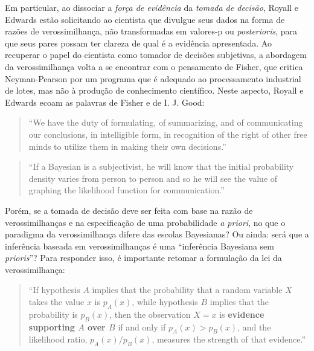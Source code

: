 Em particular, 
ao dissociar a {\em força de evidência} da {\em tomada de decisão}, Royall e Edwards estão solicitando ao cientista
que divulgue seus dados na forma de razões de verossimilhança, não transformadas em valores-p ou {\em posterioris}, para que
seus pares possam ter clareza de qual é a evidência apresentada. 
Ao recuperar o papel do cientista como tomador de decisões subjetivas, a abordagem da verossimilhança volta a se encontrar
com o pensamento de Fisher, que critica Neyman-Pearson por um programa que é adequado ao processamento industrial de lotes,
mas não à produção de conhecimento científico. Neste aspecto, Royall e Edwards ecoam as palavras de Fisher e de I. J. Good:

\begin{quote}
``We have the duty of formulating, of summarizing, and of communicating our conclusions, in intelligible form, in
recognition of the right of other free minds to utilize them in making their own decisions.'' \citep{Fisher1955}
\end{quote}

\begin{quote}
``If a Bayesian is a subjectivist, he will know that the initial probability density varies from person to person and
so he will see the value of graphing the likelihood function for communication.'' \citep{Good76}
\end{quote}

Porém, se a tomada de decisão deve ser feita com base na razão de verossimilhanças e na especificação de uma 
probabilidade {\em a priori}, no que o paradigma da verossimilhança difere das escolas Bayesianas? Ou ainda: será que a 
inferência baseada em verossimilhanças é uma ``inferência Bayesiana sem {\em prioris}''? Para responder isso,
é importante retomar a formulação da lei da verossimilhança:

\begin{quote}
``If hypothesis $A$ implies that the probability that a random variable $X$ takes the value $x$ is $p_A(x)$, while
hypothesis $B$ implies that the probability is $p_B(x)$, then the observation $X=x$ is \textbf{evidence supporting $A$ over $B$}
if and only if $p_A(x) > p_B(x)$, and the likelihood ratio, $p_A(x)/p_B(x)$, measures the strength of that evidence.''
\citep{Hacking65}
\end{quote}

